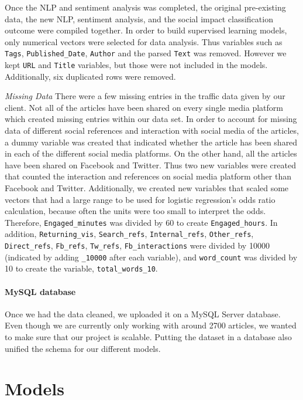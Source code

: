 \documentclass[10pt,letterpaper]{article}
\begin{document}
Once the NLP and sentiment analysis was completed, the original
pre-existing data, the new NLP, sentiment analysis, and the social
impact classification outcome were compiled together. In order to build
supervised learning models, only numerical vectors were selected for
data analysis. Thus variables such as \texttt{Tags},
\texttt{Published\_Date}, \texttt{Author} and the parsed \texttt{Text}
was removed. However we kept \texttt{URL} and \texttt{Title} variables,
but those were not included in the models. Additionally, six duplicated
rows were removed.

\emph{Missing Data} There were a few missing entries in the traffic data
given by our client. Not all of the articles have been shared on every
single media platform which created missing entries within our data set.
In order to account for missing data of different social references and
interaction with social media of the articles, a dummy variable was
created that indicated whether the article has been shared in each of
the different social media platforms. On the other hand, all the
articles have been shared on Facebook and Twitter. Thus two new
variables were created that counted the interaction and references on
social media platform other than Facebook and Twitter. Additionally, we
created new variables that scaled some vectors that had a large range to
be used for logistic regression's odds ratio calculation, because often
the units were too small to interpret the odds. Therefore,
\texttt{Engaged\_minutes} was divided by 60 to create
\texttt{Engaged\_hours}. In addition, \texttt{Returning\_vis},
\texttt{Search\_refs}, \texttt{Internal\_refs}, \texttt{Other\_refs},
\texttt{Direct\_refs}, \texttt{Fb\_refs}, \texttt{Tw\_refs},
\texttt{Fb\_interactions} were divided by 10000 (indicated by adding
\texttt{\_10000} after each variable), and \texttt{word\_count} was
divided by 10 to create the variable, \texttt{total\_words\_10}.

\hypertarget{mysql-database}{%
\paragraph{MySQL database}\label{mysql-database}}

Once we had the data cleaned, we uploaded it on a MySQL Server database.
Even though we are currently only working with around 2700 articles, we
wanted to make sure that our project is scalable. Putting the dataset in
a database also unified the schema for our different models.

\hypertarget{models}{%
\section{Models}\label{models}}
\end{document}
